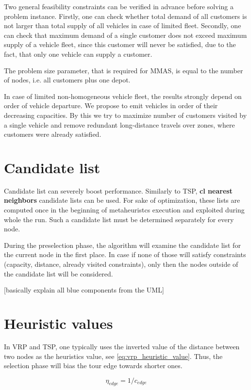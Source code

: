 \documentclass[11pt,a4paper,oneside]{book}
\begin{document}
Two general feasibility constraints can be verified in advance before solving a problem instance. Firstly, one can check whether total demand of all customers is not larger than total supply of all vehicles in case of limited fleet. Secondly, one can check that maximum demand of a single customer does not exceed maximum supply of a vehicle fleet, since this customer will never be satisfied, due to the fact, that only one vehicle can supply a customer.

The problem size parameter, that is required for MMAS, is equal to the number of nodes, i.e. all customers plus one depot.

In case of limited non-homogeneous vehicle fleet, the results strongly depend on order of vehicle departure. We propose to emit vehicles in order of their decreasing capacities. By this we try to maximize number of customers visited by a single vehicle and remove redundant long-distance travels over zones, where customers were already satisfied.

\section{Candidate list}

Candidate list can severely boost performance. Similarly to TSP, \textbf{cl nearest neighbors} candidate lists can be used. For sake of optimization, these lists are computed once in the beginning of metaheuristcs execution and exploited during whole the run. Such a candidate list must be determined separately for every node.

During the preselection phase, the algorithm will examine the candidate list for the current node in the first place. In case if none of those will satisfy constraints (capacity, distance, already visited constraints), only then the nodes outside of the candidate list will be considered.

[basically explain all blue components from the UML]

\section{Heuristic values}

In VRP and TSP, one typically uses the inverted value of the distance between two nodes as the heuristics value, see \ref{eq:vrp_heuristic_value}. Thus, the selection phase will bias the tour edge towards shorter ones.

\begin{equation}
\label{eq:vrp_heuristic_value}
\eta_{edge} = 1 / c_{edge}
\end{equation}
\end{document}
